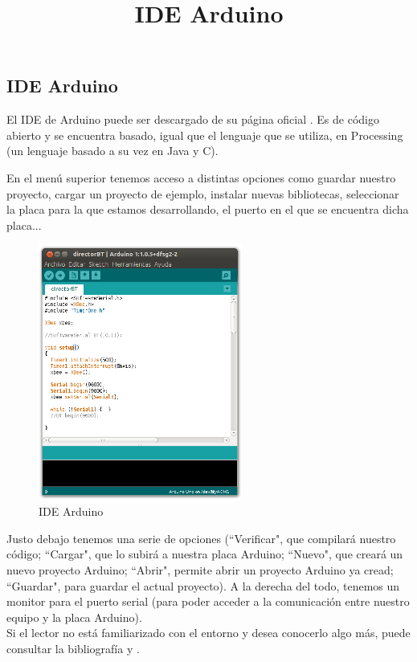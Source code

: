 \subsection{IDE Arduino}
\title{IDE Arduino}

El IDE de Arduino puede ser descargado de su página oficial \cite{arduinoWeb}. Es de código abierto y se
encuentra basado, igual que el lenguaje que se utiliza, en Processing (un lenguaje basado a su vez en Java y C).

En el menú superior tenemos acceso a distintas opciones como guardar nuestro proyecto, cargar un proyecto de ejemplo,
instalar nuevas bibliotecas, seleccionar la placa para la que estamos desarrollando, el puerto en el que se encuentra dicha
placa...\\

\begin{figure}[!htb]
\centering
\includegraphics[width=0.6\textwidth]{./imagenes/arduinoide}
\caption{IDE Arduino} \label{fig:arduinoide}
\end{figure}


Justo debajo tenemos una serie de opciones (``Verificar", que compilará nuestro código; ``Cargar", que lo
subirá a nuestra placa Arduino; ``Nuevo", que creará un nuevo proyecto Arduino; ``Abrir", permite abrir un proyecto
Arduino ya cread; ``Guardar", para guardar el actual proyecto). A la derecha del todo, tenemos un monitor para el
puerto serial (para poder acceder a la comunicación entre nuestro equipo y la placa Arduino).\\

Si el lector no está familiarizado con el entorno y desea conocerlo algo más, puede consultar la bibliografía \cite{arduinoInicia} y
\cite{arduino24}.


